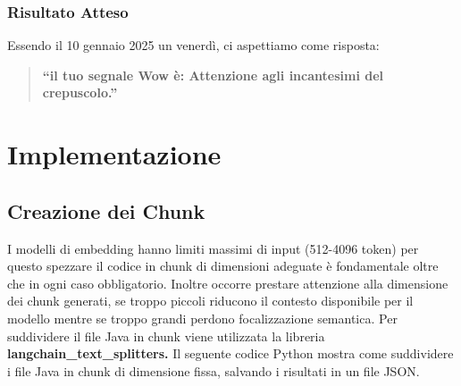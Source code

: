 \documentclass[12pt,a4paper,openright,twoside]{book}
\begin{document}
\subsubsection{Risultato Atteso}
Essendo il 10 gennaio 2025 un venerdì, ci aspettiamo come risposta:
\begin{quote}
    \textbf{``il tuo segnale Wow è: Attenzione agli incantesimi del crepuscolo.''}
\end{quote}

\section{Implementazione}
\subsection{Creazione dei Chunk}
I modelli di embedding hanno limiti massimi di input (512-4096 token)  per questo spezzare il codice in chunk di dimensioni adeguate è fondamentale oltre che in ogni caso obbligatorio.
Inoltre occorre prestare attenzione alla dimensione dei chunk generati, se troppo piccoli riducono il contesto disponibile per il modello mentre se troppo grandi perdono focalizzazione semantica.
Per suddividere il file Java in chunk viene utilizzata la libreria \textbf{langchain\_text\_splitters.}
Il seguente codice Python mostra come suddividere i file Java in chunk di dimensione fissa, salvando i risultati in un file JSON.
\end{document}
